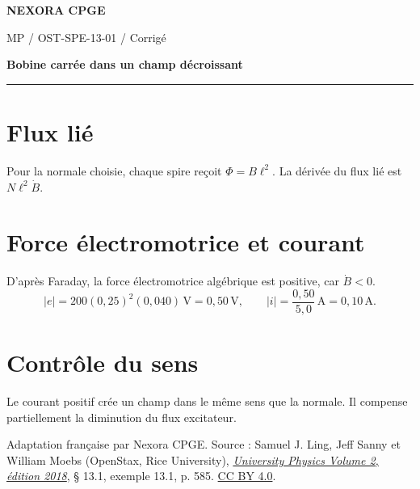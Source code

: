 \documentclass[11pt,a4paper]{article}
\begin{document}
\makeatletter
\def\@oddfoot{\footnotesize Download for free at \url{https://openstax.org/details/books/university-physics-volume-2}.\hfil\thepage}
\let\@evenfoot\@oddfoot
\makeatother
{\small\bfseries\color{nexorablue} NEXORA CPGE}\par
{\small MP / OST-SPE-13-01 / Corrigé}\par
{\LARGE\bfseries Bobine carrée dans un champ décroissant}\par
\vspace{0.25em}\hrule\vspace{0.6em}

\section*{Flux lié}
Pour la normale choisie, chaque spire reçoit $\Phi=B\ell^2$. La dérivée du flux lié est $N\ell^2\dot B$.

\section*{Force électromotrice et courant}
D’après Faraday, la force électromotrice algébrique est positive, car $\dot B<0$.
\[ |e|=200(0{,}25)^2(0{,}040)\,\mathrm V=0{,}50\,\mathrm V,\qquad |i|=\frac{0{,}50}{5{,}0}\,\mathrm A=0{,}10\,\mathrm A. \]

\section*{Contrôle du sens}
Le courant positif crée un champ dans le même sens que la normale. Il compense partiellement la diminution du flux excitateur.

\bigskip
{\footnotesize Adaptation française par Nexora CPGE. Source : Samuel J. Ling, Jeff Sanny et William Moebs (OpenStax, Rice University),
\href{https://d3bxy9euw4e147.cloudfront.net/oscms-prod/media/documents/UniversityPhysicsVolume2-OP.pdf\#page=595}{\textit{University Physics Volume 2, édition 2018}}, § 13.1, exemple 13.1, p. 585.
\href{https://creativecommons.org/licenses/by/4.0/}{CC BY 4.0}.}
\end{document}
